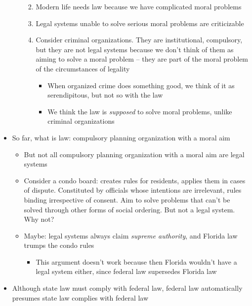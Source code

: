 \begin{itemize}
\begin{itemize}
    \begin{enumerate}
    \def\labelenumi{\arabic{enumi}.}
    \tightlist
    \item
      Modern life needs law because we have complicated moral problems
    \item
      Legal systems unable to solve serious moral problems are
      criticizable
    \item
      Consider criminal organizations. They are institutional,
      compulsory, but they are not legal systems because we don't think
      of them as aiming to solve a moral problem -- they are part of the
      moral problem of the circumstances of legality

      \begin{itemize}
      \tightlist
      \item
        When organized crime does something good, we think of it as
        serendipitous, but not so with the law
      \item
        We think the law is \emph{supposed} to solve moral problems,
        unlike criminal organizations
      \end{itemize}
    \end{enumerate}
  \end{itemize}
\item
  So far, what is law: compulsory planning organization with a moral aim

  \begin{itemize}
  \tightlist
  \item
    But not all compulsory planning organization with a moral aim are
    legal systems
  \item
    Consider a condo board: creates rules for residents, applies them in
    cases of dispute. Constituted by officials whose intentions are
    irrelevant, rules binding irrespective of consent. Aim to solve
    problems that can't be solved through other forms of social
    ordering. But not a legal system. Why not?
  \item
    Maybe: legal systems always claim \emph{supreme authority}, and
    Florida law trumps the condo rules

    \begin{itemize}
    \tightlist
    \item
      This argument doesn't work because then Florida wouldn't have a
      legal system either, since federal law supersedes Florida law
    \end{itemize}
  \end{itemize}
\item
  Although state law must comply with federal law, federal law
  automatically presumes state law complies with federal law


\end{itemize}
